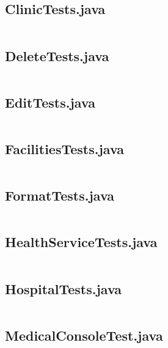 \documentclass{article}
\begin{document}
	\subsection{ClinicTests.java} 
	\inputminted{java}{src/test/java/com/yvesstraten/medicalconsole/tests/ClinicTests.java}

	\subsection{DeleteTests.java} 
	\inputminted{java}{src/test/java/com/yvesstraten/medicalconsole/tests/DeleteTests.java}

	\subsection{EditTests.java} 
	\inputminted{java}{src/test/java/com/yvesstraten/medicalconsole/tests/EditTests.java}

	\subsection{FacilitiesTests.java} 
	\inputminted{java}{src/test/java/com/yvesstraten/medicalconsole/tests/FacilitiesTests.java}

	\subsection{FormatTests.java} 
	\inputminted{java}{src/test/java/com/yvesstraten/medicalconsole/tests/FormatTests.java}

	\subsection{HealthServiceTests.java} 
	\inputminted{java}{src/test/java/com/yvesstraten/medicalconsole/tests/HealthServiceTests.java}

	\subsection{HospitalTests.java} 
	\inputminted{java}{src/test/java/com/yvesstraten/medicalconsole/tests/HospitalTests.java}

	\subsection{MedicalConsoleTest.java} 
	\inputminted{java}{src/test/java/com/yvesstraten/medicalconsole/tests/MedicalConsoleTest.java}
\end{document}
